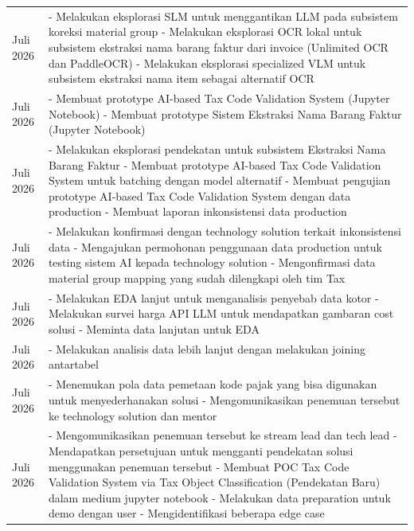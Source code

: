 \begin{longtable}{>{\raggedright\arraybackslash}p{2.7cm} >{\raggedright\arraybackslash}p{\dimexpr\textwidth-2.7cm-4\tabcolsep\relax}}
    2 Juli 2026 & - Melakukan eksplorasi SLM untuk menggantikan LLM pada subsistem koreksi material group \newline - Melakukan eksplorasi OCR lokal untuk subsistem ekstraksi nama barang faktur dari invoice (Unlimited OCR dan PaddleOCR) \newline - Melakukan eksplorasi specialized VLM untuk subsistem ekstraksi nama item sebagai alternatif OCR \\
    3 Juli 2026 & - Membuat prototype AI-based Tax Code Validation System (Jupyter Notebook) \newline - Membuat prototype Sistem Ekstraksi Nama Barang Faktur (Jupyter Notebook) \\
    6 Juli 2026 & - Melakukan eksplorasi pendekatan untuk subsistem Ekstraksi Nama Barang Faktur \newline - Membuat prototype AI-based Tax Code Validation System untuk batching dengan model alternatif \newline - Membuat pengujian prototype AI-based Tax Code Validation System dengan data production \newline - Membuat laporan inkonsistensi data production \\
    7 Juli 2026 & - Melakukan konfirmasi dengan technology solution terkait inkonsistensi data \newline - Mengajukan permohonan penggunaan data production untuk testing sistem AI kepada technology solution \newline - Mengonfirmasi data material group mapping yang sudah dilengkapi oleh tim Tax \\
    8 Juli 2026 & - Melakukan EDA lanjut untuk menganalisis penyebab data kotor \newline - Melakukan survei harga API LLM untuk mendapatkan gambaran cost solusi \newline - Meminta data lanjutan untuk EDA \\
    9 Juli 2026 & - Melakukan analisis data lebih lanjut dengan melakukan joining antartabel \\
    10 Juli 2026 & - Menemukan pola data pemetaan kode pajak yang bisa digunakan untuk menyederhanakan solusi \newline - Mengomunikasikan penemuan tersebut ke technology solution dan mentor \\
    13 Juli 2026 & - Mengomunikasikan penemuan tersebut ke stream lead dan tech lead \newline - Mendapatkan persetujuan untuk mengganti pendekatan solusi menggunakan penemuan tersebut \newline - Membuat POC Tax Code Validation System via Tax Object Classification (Pendekatan Baru) dalam medium jupyter notebook \newline - Melakukan data preparation untuk demo dengan user \newline - Mengidentifikasi beberapa edge case \\

\end{longtable}
